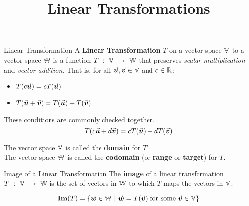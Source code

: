 \documentclass{beamer}
\title[MA245 - Section 5.1]{Linear Transformations}
\begin{document}
\begin{frame}
  \titlepage
\end{frame}

\begin{frame}
\begin{block}{Linear Transformation}
A \textbf{Linear Transformation} $T$ on a vector space $\mathbb{V}$ to a vector space $\mathbb{W}$ is a function $T\ :\ \mathbb{V}\ \rightarrow\ \mathbb{W}$ that preserves \emph{scalar multiplication} and \emph{vector addition}. That is, for all ${\vec{\boldsymbol{u}}}, {\vec{\boldsymbol{v}}}\in\mathbb{V}$ and $c\in\mathbb{R}$:
\begin{itemize}
\item $T (c{\vec{\boldsymbol{u}}})=cT ({\vec{\boldsymbol{u}}})$
\item $T ({\vec{\boldsymbol{u}}}+{\vec{\boldsymbol{v}}})=T ({\vec{\boldsymbol{u}}})+T ({\vec{\boldsymbol{v}}})$
\end{itemize}\pause
These conditions are commonly checked together.
\begin{equation*}
T(c{\vec{\boldsymbol{u}}}+d{\vec{\boldsymbol{v}}})=cT({\vec{\boldsymbol{u}}})+dT({\vec{\boldsymbol{v}}})
\end{equation*}
\end{block}\pause
\begin{block}{}
The vector space $\mathbb{V}$ is called the \textbf{domain} for $T$\\
The vector space $\mathbb{W}$ is called the \textbf{codomain} (or \textbf{range} or \textbf{target}) for $T$.
\end{block}\pause
\begin{block}{Image of a Linear Transformation}
The \textbf{image} of a linear transformation $T\ :\ \mathbb{V}\ \rightarrow\ \mathbb{W}$ is the set of vectors in $\mathbb{W}$ to which $T$ maps the vectors in $\mathbb{V}$:

\vspace{-4mm}
\begin{equation*}
\operatorname{\textbf{Im}}(T) = \left\{{\vec{\boldsymbol{w}}}\in\mathbb{W}\ \middle|\ {\vec{\boldsymbol{w}}}=T({\vec{\boldsymbol{v}}})\text{ for some } {\vec{\boldsymbol{v}}}\in\mathbb{V}\right\}
\end{equation*}
\end{block}
\end{frame}
\end{document}
